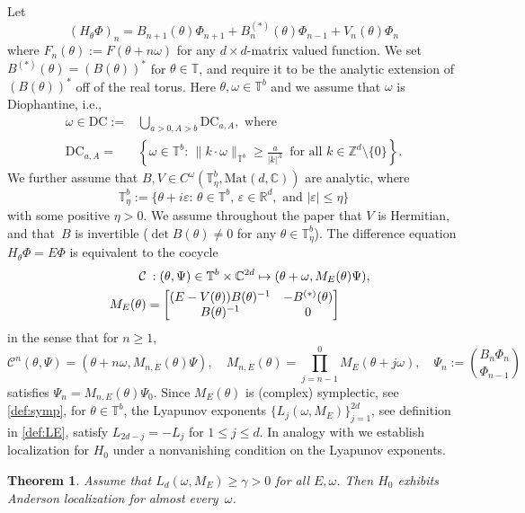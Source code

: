 \documentclass[11pt]{amsart}
\newtheorem{theorem}{Theorem}[section]
\newcommand{\Z}{\mathbb Z}
\newcommand{\R}{\mathbb R}
\newcommand{\C}{\mathbb C}
\newcommand{\T}{\mathbb T}
\def\calC{\mathcal{C}}
\def\tor{\mathbb{T}}
\def\Mat{\mathrm{Mat}}
\begin{document}
Let 
\begin{equation}\label{eq:BVsys}
   (H_\theta \Phi)_n   = B_{n+1}(\theta)\Phi_{n+1}+ B_n^{(*)}(\theta) \Phi_{n-1}+ V_n (\theta)\Phi_n
\end{equation}
where $F_n(\theta):=F(\theta+n\omega)$ for any $d\times d$-matrix valued function. We set $B^{(*)}(\theta)=(B(\theta))^*$ for $\theta\in \T$, and require it to be the analytic extension of $(B(\theta))^*$ off of the real torus. Here $\theta,\omega\in\tor^b$ and we assume that $\omega$ is Diophantine, i.e.,
\begin{align}
    \omega\in \mathrm{DC}:=&\bigcup_{a>0, A>b} \mathrm{DC}_{a,A}, \text{ where}\\
    \mathrm{DC}_{a,A}=&\left\{\omega\in \T^b:\, \|k\cdot \omega\|_{\T^b}\geq \frac{a}{|k|^A}\, \text{ for all } k\in \Z^d\setminus \{0\}\right\}.
\end{align}  
We further assume that $B,V\in C^{\omega}(\tor^b_{\eta}, \Mat(d,\C))$ are analytic, where $$\T^b_{\eta}:=\{\theta+i\varepsilon:\, \theta\in \T^b,\, \varepsilon\in \R^d,  \text{ and } |\varepsilon|\leq \eta\}$$with some positive $\eta>0$. 
We assume throughout the paper that $V$ is Hermitian, and that~$B$ is invertible ($\det B(\theta)\neq 0$ for any $\theta\in \T^b_{\eta}$). 
The difference equation $H_{\theta} \Phi=E\Phi$ is equivalent to the cocycle 
\begin{align}\label{def:M_E}
  \calC &\::  (\theta,\Psi)\in \tor^b\times \C^{2d}\mapsto (\theta+\omega, M_E(\theta)\Psi), \notag  \\
  \quad M_{E}(\theta) &= \left [ \begin{matrix}
   ( E-V(\theta))B(\theta)^{-1}  & -B^{(*)}(\theta) \\
  B(\theta)^{-1} & 0 
\end{matrix}\right]  
\end{align}
in the sense that for $n\ge1$, \[ \calC^n (\theta,\Psi)=(\theta+n\omega, M_{n,E}(\theta)\Psi), \quad M_{n,E}(\theta)=\prod_{j=n-1}^0 M_E(\theta+j\omega), \quad 
\Psi_n:=\binom{B_{n}\Phi_n}{\Phi_{n-1}}\] satisfies $\Psi_n = M_{n,E} (\theta) \Psi_0$.  Since $M_E(\theta)$ is (complex) symplectic, see \eqref{def:symp}, for $\theta\in \T^b$, the Lyapunov exponents $\{L_j(\omega,M_E)\}_{j=1}^{2d}$, see definition in \eqref{def:LE}, satisfy $L_{2d-j}=-L_j$ for $1\le j\le d$. 
In analogy with \cite{BG} we establish localization for $H_0$ under a nonvanishing condition on the Lyapunov exponents.

\begin{theorem}
    \label{thm:main}
    Assume that $L_d(\omega,M_E)\ge \gamma>0$ for all $E,\omega$. Then $H_0$ exhibits Anderson localization for almost every~$\omega$.
\end{theorem}
\end{document}
